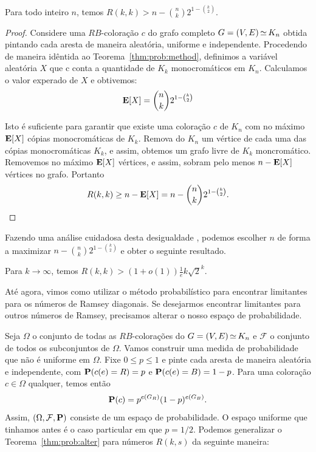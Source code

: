 \begin{theorem}
\label{thm:prob:alter}
Para todo inteiro $n$, temos $\displaystyle R(k,k) > n - \binom{n}{k}2^{1 - \binom{k}{2}}$.
\end{theorem}
\begin{proof}
Considere uma $RB$-coloração $c$ do grafo completo $G = (V,E) \operatorname{\simeq} K_n$ obtida pintando cada aresta de maneira aleatória, uniforme e independente. Procedendo de maneira idêntida ao Teorema~\ref{thm:prob:method}, definimos a variável aleatória $X$ que c conta a quantidade de $K_k$ monocromáticos em $K_n$. Calculamos o valor experado de $X$ e obtivemos:
\[ \operatorname{\mathbf{E}}[X] = \binom{n}{k} 2^{1 - \binom{k}{2}} \]

Isto é suficiente para garantir que existe uma coloração $c$ de $K_n$ com no máximo $\operatorname{\mathbf{E}}[X]$ cópias monocromáticas de $K_k$. Remova do $K_n$ um vértice de cada uma das cópias monocromáticas $K_k$, e assim, obtemos um grafo livre de $K_k$ moncromático. Removemos no máximo $\operatorname{\mathbf{E}}[X]$ vértices, e assim, sobram pelo menos $n - \operatorname{\mathbf{E}}[X]$ vértices no grafo. Portanto
\[ R(k,k) \geq n - \operatorname{\mathbf{E}}[X] = n - \binom{n}{k} 2^{1 - \binom{k}{2}}.  \qedhere\]
\end{proof}

Fazendo uma análise cuidadosa desta desigualdade \cite{spencer2014asymptopia}, podemos escolher $n$ de forma a maximizar $n - \binom{n}{k}2^{1 - \binom{k}{2}}$ e obter o seguinte resultado.

\begin{corollary}
Para $k \to \infty$, temos $\displaystyle R(k,k) > (1+o(1))\frac{1}{e}k\sqrt{2}^k$.
\end{corollary}

Até agora, vimos como utilizar o método probabilístico para encontrar limitantes para os números de Ramsey diagonais. Se desejarmos encontrar limitantes para outros números de Ramsey, precisamos alterar o nosso espaço de probabilidade.

Seja $\Omega$ o conjunto de todas as $RB$-colorações do $G = (V,E) \operatorname{\simeq} K_n$ e $\mathcal{F}$ o conjunto de todos os subconjuntos de $\Omega$. Vamos construir uma medida de probabilidade que não é uniforme em $\Omega$. Fixe $0 \leq p \leq 1$ e pinte cada aresta de maneira aleatória e independente, com $\operatorname{\mathbf{P}}(c(e) = R) = p$ e $\operatorname{\mathbf{P}}(c(e) = B) = 1 - p$. Para uma coloração $c \in \Omega$ qualquer, temos então
\[ \operatorname{\mathbf{P}}(c) =  p^{e(G_R)}(1-p)^{e(G_B)}.\]
Assim, $(\Omega, \mathcal{F}, \operatorname{\mathbf{P}})$ consiste de um espaço de probabilidade. O espaço uniforme que tinhamos antes é o caso particular em que $p = 1/2$. Podemos generalizar o Teorema~\ref{thm:prob:alter} para números $R(k,s)$ da seguinte maneira:

